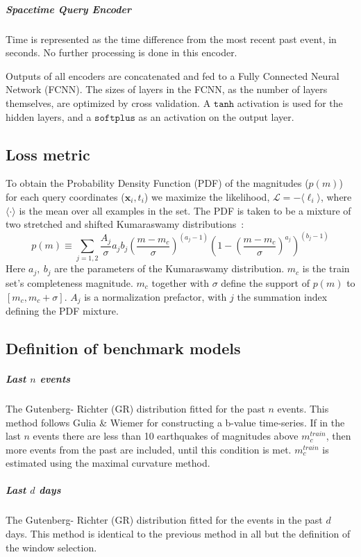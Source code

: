 \documentclass[pdflatex]{sn-jnl}
\begin{document}
\subparagraph{\textbf{Spacetime Query Encoder}} Time is represented as the time difference from the most recent past event, in seconds. No further processing is done in this encoder.

Outputs of all encoders are concatenated and fed to a Fully Connected Neural Network (FCNN). The sizes of layers in the FCNN, as the number of layers themselves, are optimized by cross validation. A $\texttt{tanh}$ activation is used for the hidden layers, and a $\texttt{softplus}$ as an activation on the output layer. 

\subsection{Loss metric}
To obtain the Probability Density Function (PDF) of the magnitudes ($p(m)$) for each query coordinates ($\textbf{x}_i, t_i$) we maximize the likelihood, $\mathcal{L} = -\langle \ell_i \rangle$, where $\langle \cdot\rangle$ is the mean over all examples in the set. The PDF is taken to be a mixture of two stretched and shifted Kumaraswamy distributions~\cite{kumaraswamy_generalized_1980}:
\begin{equation}
    p\left( m \right)
    \equiv
    \sum_{j=1,2} \frac{A_j}{\sigma}a_jb_j\left(\frac{m-m_c}{\sigma}\right)^{\left(a_j-1\right)}\left(1-\left(\frac{m-m_c}{\sigma}\right)^{a_j}\right)^{\left(b_j-1\right)}
\end{equation}
Here $a_j, \ b_j$ are the parameters of the Kumaraswamy distribution. $m_c$ is the train set's completeness magnitude. $m_c$ together with $\sigma$ define the support of $p(m)$ to $[m_c, m_c+\sigma]$. $A_j$ is a normalization prefactor, with $j$ the summation index defining the PDF mixture.

\subsection{Definition of benchmark models}
\subparagraph{Last $n$ events} The Gutenberg- Richter (GR) distribution fitted for the past $n$ events. This method follows Gulia \& Wiemer\cite{gulia_real-time_2019} for constructing a b-value time-series. If in the last $n$ events there are less than 10 earthquakes of magnitudes above $m_c^{train}$, then more events from the past are included, until this condition is met. $m_c^{train}$ is estimated using the maximal curvature method\cite{wiemer_minimum_2000}.

\subparagraph{Last $d$ days} The Gutenberg- Richter (GR) distribution fitted for the events in the past $d$ days. This method is identical to the previous method in all but the definition of the window selection.
\end{document}
